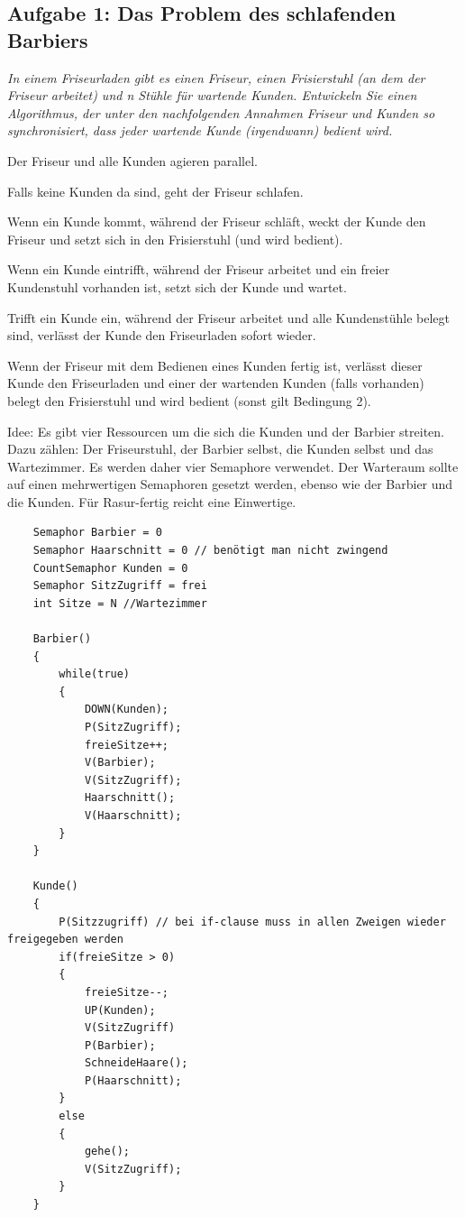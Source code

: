 \documentclass[a4paper]{article}
\begin{document}
\subsection{Aufgabe 1: Das Problem des schlafenden Barbiers}
\textit{In einem Friseurladen gibt es einen Friseur, einen Frisierstuhl (an dem der Friseur arbeitet) und n Stühle für wartende Kunden. Entwickeln Sie einen Algorithmus, der unter den nachfolgenden Annahmen Friseur und Kunden so synchronisiert, dass jeder wartende Kunde (irgendwann) bedient wird.}
\begin{itemize*}
    \item Der Friseur und alle Kunden agieren parallel.
    \item Falls keine Kunden da sind, geht der Friseur schlafen.
    \item Wenn ein Kunde kommt, während der Friseur schläft, weckt der Kunde den Friseur und setzt sich in den Frisierstuhl (und wird bedient).
    \item Wenn ein Kunde eintrifft, während der Friseur arbeitet und ein freier Kundenstuhl vorhanden ist, setzt sich der Kunde und wartet.
    \item Trifft ein Kunde ein, während der Friseur arbeitet und alle Kundenstühle belegt sind, verlässt der Kunde den Friseurladen sofort wieder.
    \item Wenn der Friseur mit dem Bedienen eines Kunden fertig ist, verlässt dieser Kunde den Friseurladen und einer der wartenden Kunden (falls vorhanden) belegt den Frisierstuhl und wird bedient (sonst gilt Bedingung 2).
\end{itemize*}
\vspace{10mm}
Idee: Es gibt vier Ressourcen um die sich die Kunden und der Barbier streiten. Dazu zählen: Der Friseurstuhl, der Barbier selbst, die Kunden selbst und das Wartezimmer. Es werden daher vier Semaphore verwendet. Der Warteraum sollte auf einen mehrwertigen Semaphoren gesetzt werden, ebenso wie der Barbier und die Kunden. Für Rasur-fertig reicht eine Einwertige.

\begin{lstlisting}
    Semaphor Barbier = 0
    Semaphor Haarschnitt = 0 // benötigt man nicht zwingend
    CountSemaphor Kunden = 0
    Semaphor SitzZugriff = frei
    int Sitze = N //Wartezimmer
    
    Barbier()
    {
        while(true)
        {
            DOWN(Kunden);
            P(SitzZugriff);
            freieSitze++; 
            V(Barbier);
            V(SitzZugriff);
            Haarschnitt();
            V(Haarschnitt);
        }
    }
    
    Kunde()
    {
        P(Sitzzugriff) // bei if-clause muss in allen Zweigen wieder freigegeben werden
        if(freieSitze > 0)
        {
            freieSitze--;
            UP(Kunden);
            V(SitzZugriff)
            P(Barbier);
            SchneideHaare(); 
            P(Haarschnitt);	
        }
        else 
        {
            gehe(); 
            V(SitzZugriff);
        }
    }
    \end{lstlisting}
    
\end{document}
